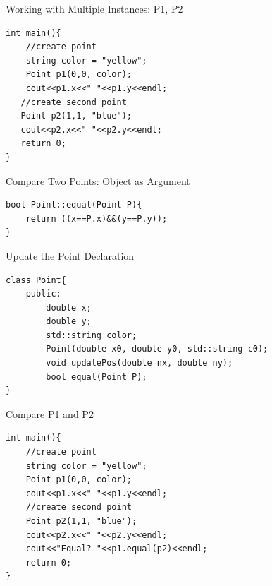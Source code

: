 \documentclass[xcolor={dvipsnames}]{beamer}
\begin{document}
\begin{frame}[fragile]{Working with Multiple Instances: P1, P2}
\begin{verbatim}
int main(){
    //create point
    string color = "yellow";
    Point p1(0,0, color);
    cout<<p1.x<<" "<<p1.y<<endl;
   //create second point
   Point p2(1,1, "blue");
   cout<<p2.x<<" "<<p2.y<<endl;
   return 0;
}
\end{verbatim}
\end{frame}

\begin{frame}[fragile]{Compare Two Points: Object as Argument}
\begin{verbatim}
bool Point::equal(Point P){
    return ((x==P.x)&&(y==P.y));
}
\end{verbatim}
\end{frame}

\begin{frame}[fragile]{Update the Point Declaration}
\begin{verbatim}
class Point{
    public:
        double x;
        double y;
        std::string color;
        Point(double x0, double y0, std::string c0);
        void updatePos(double nx, double ny);
        bool equal(Point P);
}
\end{verbatim}
\end{frame}

\begin{frame}[fragile]{Compare P1 and P2}
\begin{verbatim}
int main(){
    //create point
    string color = "yellow";
    Point p1(0,0, color);
    cout<<p1.x<<" "<<p1.y<<endl;
    //create second point
    Point p2(1,1, "blue");
    cout<<p2.x<<" "<<p2.y<<endl;
    cout<<"Equal? "<<p1.equal(p2)<<endl;
    return 0;
}
\end{verbatim}
\end{frame}
\end{document}
